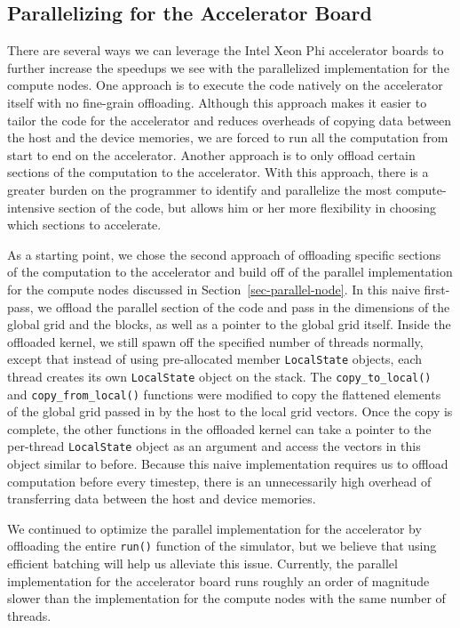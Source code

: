 
\subsection{Parallelizing for the Accelerator Board}
\label{sec-parallel-device}

There are several ways we can leverage the Intel Xeon Phi accelerator
boards to further increase the speedups we see with the parallelized
implementation for the compute nodes. One approach is to execute the code
natively on the accelerator itself with no fine-grain
offloading. Although this approach makes it easier to tailor the code for
the accelerator and reduces overheads of copying data between the host
and the device memories, we are forced to run all the computation from
start to end on the accelerator. Another approach is to only offload
certain sections of the computation to the accelerator. With this
approach, there is a greater burden on the programmer to identify and
parallelize the most compute-intensive section of the code, but allows
him or her more flexibility in choosing which sections to accelerate.

As a starting point, we chose the second approach of offloading specific
sections of the computation to the accelerator and build off of the
parallel implementation for the compute nodes discussed in
Section~\ref{sec-parallel-node}. In this naive first-pass, we offload the
parallel section of the code and pass in the dimensions of the global
grid and the blocks, as well as a pointer to the global grid
itself. Inside the offloaded kernel, we still spawn off the specified
number of threads normally, except that instead of using pre-allocated
member \texttt{LocalState} objects, each thread creates its own \texttt{LocalState} object
on the stack. The \texttt{copy\_to\_local()} and
\texttt{copy\_from\_local()} functions were modified to copy the
flattened elements of the global grid passed in by the host to the local
grid vectors. Once the copy is complete, the other functions in the
offloaded kernel can take a pointer to the per-thread \texttt{LocalState} object
as an argument and access the vectors in this object similar to before.
Because this naive implementation requires us to offload computation
before every timestep, there is an unnecessarily high overhead of
transferring data between the host and device memories.

We continued to optimize the parallel implementation for the accelerator
by offloading the entire \texttt{run()} function of the simulator, but we believe
that using efficient batching will help us alleviate this
issue. Currently, the parallel implementation for the accelerator board
runs roughly an order of magnitude slower than the implementation for the
compute nodes with the same number of threads.
